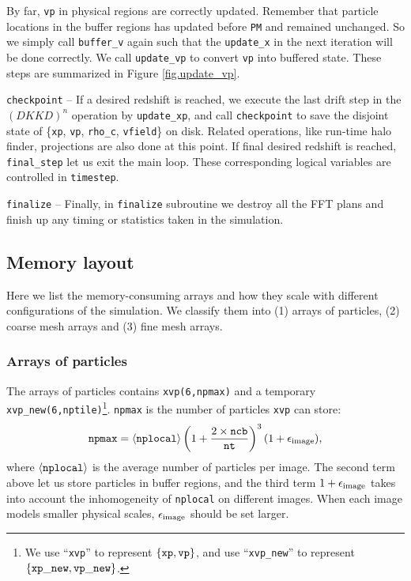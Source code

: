 \documentclass[10pt,twocolumn,preprint]{emulateapj}
\begin{document}
By far, {\tt vp} in physical regions are correctly updated. Remember that particle locations in the buffer regions has updated before {\tt PM} and remained unchanged. So we simply call {\tt buffer\_v} again such that the {\tt update\_x} in the next iteration will be done correctly. We call {\tt update\_vp} to convert {\tt vp} into buffered state. These steps are summarized in Figure \ref{fig.update_vp}.

{\tt checkpoint} -- 
If a desired redshift is reached, we execute the last drift step in the $(DKKD)^n$ operation by {\tt update\_xp}, and call {\tt checkpoint} to save the disjoint state of \{{\tt xp}, {\tt vp}, {\tt rho\_c}, {\tt vfield}\} on disk. Related operations, like run-time halo finder, projections are also done at this point. If final desired redshift is reached, {\tt final\_step} let us exit the main loop. These corresponding logical variables are controlled in {\tt timestep}.

{\tt finalize} --
Finally, in {\tt finalize} subroutine we destroy all the FFT plans and finish up any timing or statistics taken in the simulation.

\subsection{Memory layout}\label{ss.memory}
Here we list the memory-consuming arrays and how they scale with different configurations of the simulation. We classify them into (1) arrays of particles, (2) coarse mesh arrays and (3) fine mesh arrays.

\subsubsection{Arrays of particles}
The arrays of particles contains {\tt xvp(6,npmax)} and a temporary {\tt xvp\_new(6,nptile)}\footnote{We use ``{\tt xvp}'' to represent $\{{\tt xp},{\tt vp}\}$, and use ``{\tt xvp\_new}'' to represent $\{{\tt xp\_new},{\tt vp\_new}\}$.}. {\tt npmax} is the number of particles {\tt xvp} can store:
\begin{equation}\label{eq.npmax}
	{\tt npmax}=\left\langle {\tt nplocal} \right\rangle \left( 1+\frac{2\times {\tt ncb}}{\tt nt} \right)^3(1+\epsilon_{\rm image}),
\end{equation}
where $\left\langle {\tt nplocal} \right\rangle$ is the average number of particles per image. The second term above let us store particles in buffer regions, and the third term $1+\epsilon_{\rm image}$ takes into account the inhomogeneity of {\tt nplocal} on different images. When each image models smaller physical scales, $\epsilon_{\rm image}$ should be set larger. 
\end{document}
